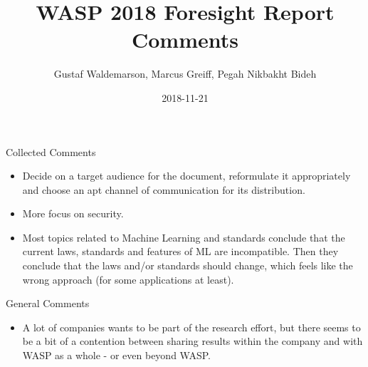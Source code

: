 \documentclass{beamer}
\title{WASP 2018 Foresight Report Comments}
\date{2018-11-21}
\author{Gustaf Waldemarson, Marcus Greiff, Pegah Nikbakht Bideh}
\begin{document}
\begin{frame}
  \titlepage
\end{frame}

\begin{frame}{Collected Comments}

  \begin{itemize}
  \item Decide on a target audience for the document, reformulate it
    appropriately and choose an apt channel of communication for its
    distribution.

  \item More focus on security.

  \item Most topics related to Machine Learning and standards conclude that the
    current laws, standards and features of ML are incompatible. Then they
    conclude that the laws and/or standards should change, which feels like the
    wrong approach (for some applications at least).
    
  \end{itemize}
  
\end{frame}


\begin{frame}{General Comments}

  \begin{itemize}

  \item A lot of companies wants to be part of the research effort, but there
    seems to be a bit of a contention between sharing results within the company
    and with WASP as a whole - or even beyond WASP.


  \end{itemize}

\end{frame}
\end{document}

